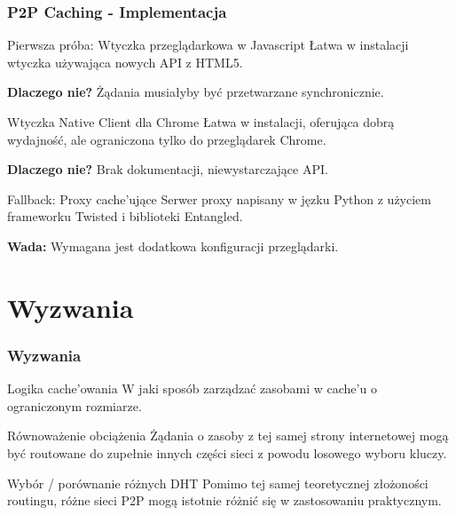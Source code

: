 \documentclass{beamer}
\begin{document}
\begin{frame}
\frametitle{P2P Caching - Implementacja}

\begin{block}{Pierwsza próba: Wtyczka przeglądarkowa w Javascript}
Łatwa w instalacji wtyczka używająca nowych API z HTML5.

\textbf{Dlaczego nie?} Żądania musiałyby być przetwarzane synchronicznie.
\end{block}

\pause
\begin{block}{Wtyczka Native Client dla Chrome}
Łatwa w instalacji, oferująca dobrą wydajność, ale ograniczona tylko do przeglądarek Chrome.

\textbf{Dlaczego nie?} Brak dokumentacji, niewystarczające API.
\end{block}

\pause
\begin{block}{Fallback: Proxy cache'ujące}
Serwer proxy napisany w jęzku Python z użyciem frameworku Twisted i biblioteki Entangled.

\textbf{Wada:} Wymagana jest dodatkowa konfiguracji przeglądarki.
\end{block}

\end{frame}

\section{Wyzwania}
\begin{frame}
\frametitle{Wyzwania}

\begin{block}{Logika cache'owania}
W jaki sposób zarządzać zasobami w cache'u o ograniczonym rozmiarze.
\end{block}

\begin{block}{Równoważenie obciążenia}
Żądania o zasoby z tej samej strony internetowej mogą być routowane do zupełnie
innych części sieci z powodu losowego wyboru kluczy.
\end{block}

\begin{block}{Wybór / porównanie różnych DHT}
Pomimo tej samej teoretycznej złożoności routingu, różne sieci P2P
mogą istotnie różnić się w zastosowaniu praktycznym.
\end{block}

\end{frame}
\end{document}
